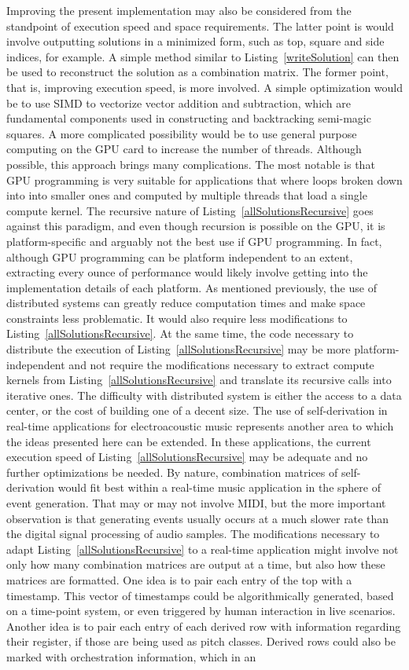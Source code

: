 Improving the present implementation may also be considered from the standpoint of execution speed and space requirements. The latter point is would involve outputting solutions in a minimized form, such as top, square and side indices, for example. A simple method similar to Listing~\ref{writeSolution} can then be used to reconstruct the solution as a combination matrix. The former point, that is, improving execution speed, is more involved. A simple optimization would be to use SIMD to vectorize vector addition and subtraction, which are fundamental components used in constructing and backtracking semi-magic squares. A more complicated possibility would be to use general purpose computing on the GPU card to increase the number of threads. Although possible, this approach brings many complications. The most notable is that GPU programming is very suitable for applications that where loops broken down into into smaller ones and computed by multiple threads that load a single compute kernel. The recursive nature of Listing~\ref{allSolutionsRecursive} goes against this paradigm, and even though recursion is possible on the GPU, it is platform-specific and arguably not the best use if GPU programming. In fact, although GPU programming can be platform independent to an extent, extracting every ounce of performance would likely involve getting into the implementation details of each platform. As mentioned previously, the use of distributed systems can greatly reduce computation times and make space constraints less problematic. It would also require less modifications to Listing~\ref{allSolutionsRecursive}. At the same time, the code necessary to distribute the execution of Listing~\ref{allSolutionsRecursive} may be more platform-independent and not require the modifications necessary to extract compute kernels from Listing~\ref{allSolutionsRecursive} and translate its recursive calls into iterative ones. The difficulty with distributed system is either the access to a data center, or the cost of building one of a decent size. The use of self-derivation in real-time applications for electroacoustic music represents another area to which the ideas presented here can be extended. In these applications, the current execution speed of Listing~\ref{allSolutionsRecursive} may be adequate and no further optimizations be needed. By nature, combination matrices of self-derivation would fit best within a real-time music application in the sphere of event generation. That may or may not involve MIDI, but the more important observation is that generating events usually occurs at a much slower rate than the digital signal processing of audio samples. The modifications necessary to adapt Listing~\ref{allSolutionsRecursive} to a real-time application might involve not only how many combination matrices are output at a time, but also how these matrices are formatted. One idea is to pair each entry of the top with a timestamp. This vector of timestamps could be algorithmically generated, based on a time-point system, or even triggered by human interaction in live scenarios. Another idea is to pair each entry of each derived row with information regarding their register, if those are being used as pitch classes. Derived rows could also be marked with orchestration information, which in an 